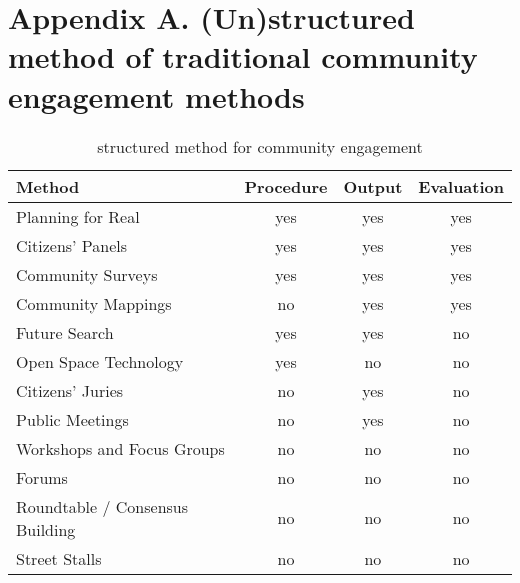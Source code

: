 \chapter{Appendix A. (Un)structured method of traditional community engagement methods}
\label{app:traditional}

\begin{table*}
\centering
\begin{tabular}{|m{15em}|c|c|c|}
Method & Procedure & Output & Evaluation \\
\toprule
Planning for Real & yes & yes & yes \\
Citizens' Panels & yes & yes & yes \\ 
Community Surveys & yes & yes & yes \\
Community Mappings & no & yes & yes \\
Future Search & yes & yes & no \\
Open Space Technology & yes & no & no \\
Citizens' Juries & no & yes & no \\
Public Meetings & no & yes & no \\
Workshops and Focus Groups & no & no & no \\
Forums & no & no & no \\
Roundtable / Consensus Building & no & no & no \\
Street Stalls & no & no & no \\
\end{tabular}
\caption{structured method for community engagement}
\label{tab:traditional_method}
\end{table*}

\clearpage
\newpage
